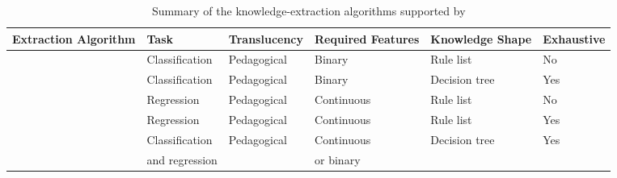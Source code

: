 
\begin{table}
    \begin{adjustbox}{width=\linewidth}
    	\begin{tabular}{llllll}
    		\hline
    		Extraction Algorithm & Task & Translucency & Required Features & Knowledge Shape & Exhaustive \\
    		\hline\hline
    		\real{} & Classification & Pedagogical & Binary & Rule list & No \\
    		\trepan{} & Classification & Pedagogical & Binary & Decision tree  & Yes\\
    		\iter{} & Regression & Pedagogical & Continuous & Rule list & No \\
    		\gridex{} & Regression & Pedagogical & Continuous & Rule list & Yes \\
    		\cart{} & Classification & Pedagogical & Continuous & Decision tree & Yes \\
    		& and regression & & or binary & & \\
    		\hline
    	\end{tabular}
    \end{adjustbox}
    \smallskip
    \caption{Summary of the knowledge-extraction algorithms supported by \psyke{}}
    \label{tab:psyke}
\end{table}
